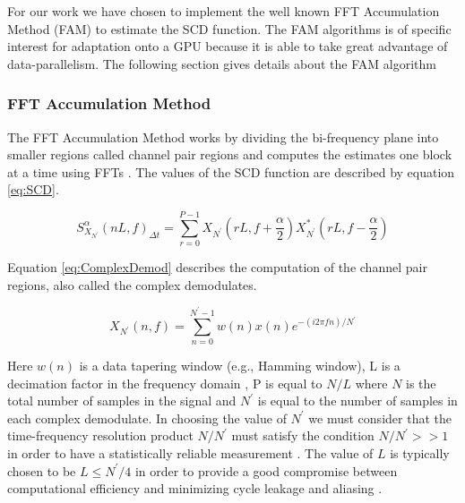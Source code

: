 For our work we have chosen to implement the well known FFT Accumulation Method (FAM) to estimate the SCD function.  The FAM algorithms is of specific interest for adaptation onto a GPU because it is able to take great advantage of data-parallelism.  The following section gives details about the FAM algorithm

\subsubsection{FFT Accumulation Method}
\label{sect:FAM}
The FFT Accumulation Method works by dividing the bi-frequency plane into smaller regions called channel pair regions and computes the estimates one block at a time using FFTs \cite{Pace03}.  The values of the SCD function are described by equation \ref{eq:SCD}.

\begin{equation}
S^{\alpha}_{X_{N^\prime}} {(n L, f)}_{\Delta t} = \sum_{r=0}^{P-1} X_{N^\prime}(r L,f + \frac{\alpha}{2}) X_{N^\prime}^*(r L, f - \frac{\alpha}{2})
\label{eq:SCD}
\end{equation}

Equation \ref{eq:ComplexDemod} describes the computation of the channel pair regions, also called the complex demodulates.

\begin{equation}
X_{N^\prime}(n,f) = \sum_{n=0}^{N^\prime - 1} w(n) x(n) e^{-(i 2 \pi f n)/N^\prime}
\label{eq:ComplexDemod}
\end{equation}

Here \begin{math}w(n)\end{math} is a data tapering window (e.g., Hamming window), L is a decimation factor in the frequency domain \cite{FenChenWan08}, P is equal to \begin{math}N / L \end{math} where $N$ is the total number of samples in the signal and $N^\prime$ is equal to the number of samples in each complex demodulate.  In choosing the value of \begin{math}N^\prime \end{math} we must consider that the time-frequency resolution product \begin{math}N/N^\prime\end{math} must satisfy the condition \begin{math}N/N^\prime >> 1\end{math} in order to have a statistically reliable measurement \cite{RobBroLoo91}.  The value of $L$ is typically chosen to be \begin{math}L \le N^\prime / 4\end{math} in order to provide a good compromise between computational efficiency and minimizing cycle leakage and aliasing \cite{RobBroLoo91}.

